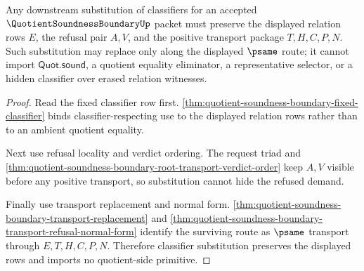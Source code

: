 \begin{theorem}
\label{thm:quotient-soundness-boundary-classifier-substitution-barrier}
Any downstream substitution of classifiers for an accepted $\QuotientSoundnessBoundaryUp$ packet must preserve the displayed relation rows $E$, the refusal pair $A,V$, and the positive transport package $T,H,C,P,N$. Such substitution may replace only along the displayed $\psame$ route; it cannot import $\mathsf{Quot.sound}$, a quotient equality eliminator, a representative selector, or a hidden classifier over erased relation witnesses.
\end{theorem}
\begin{proof}
Read the fixed classifier row first. \autoref{thm:quotient-soundness-boundary-fixed-classifier} binds classifier-respecting use to the displayed relation rows rather than to an ambient quotient equality.

Next use refusal locality and verdict ordering. The request triad and \autoref{thm:quotient-soundness-boundary-root-transport-verdict-order} keep $A,V$ visible before any positive transport, so substitution cannot hide the refused demand.

Finally use transport replacement and normal form. \autoref{thm:quotient-soundness-boundary-transport-replacement} and \autoref{thm:quotient-soundness-boundary-transport-refusal-normal-form} identify the surviving route as $\psame$ transport through $E,T,H,C,P,N$. Therefore classifier substitution preserves the displayed rows and imports no quotient-side primitive.
\end{proof}

